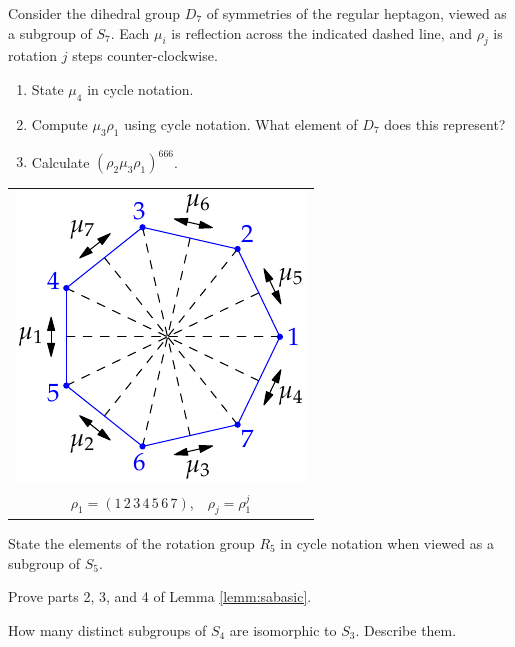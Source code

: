 \begin{exercises}
\begin{enumerate}
	\begin{minipage}[t]{.6\textwidth}\vspace{0pt}
	\item Consider the dihedral group $D_7$ of symmetries of the regular heptagon, viewed as a subgroup of $S_7$. Each $\mu_i$ is reflection across the indicated dashed line, and $\rho_j$ is rotation $j$ steps counter-clockwise.
	\begin{enumerate}
		\item State $\mu_4$ in cycle notation.
		\item Compute $\mu_3\rho_1$ using cycle notation. What element of $D_7$ does this represent?
		\item Calculate $(\rho_2\mu_3\rho_1)^{666}$.
	\end{enumerate}
	\end{minipage}\hfill\begin{minipage}[t]{.29\textwidth}\vspace{0pt}
		\flushright\begin{tabular}{@{}c@{}}
			\includegraphics{perm-heptagon}\\
			$\rho_1=(1\,2\,3\,4\,5\,6\,7)$,\ \ $\rho_j=\rho_1^j$
		\end{tabular}
	\end{minipage}
	
	
	\item State the elements of the rotation group $R_5$ in cycle notation when viewed as a subgroup of $S_5$.
  
  
  \item Prove parts 2, 3, and 4 of Lemma \ref{lemm:sabasic}.
  
  
  \item How many distinct subgroups of $S_4$ are isomorphic to $S_3$. Describe them.
  

\end{enumerate}
\end{exercises}

